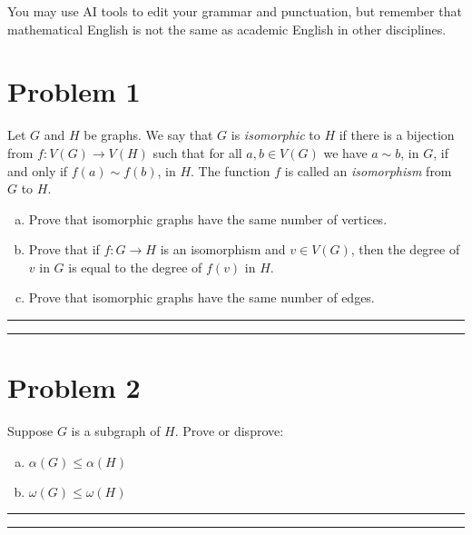 \documentclass{article}
\theoremstyle{definition}
\newenvironment{solution}{\bigskip\hrule{\hfill}}{\bigskip\hrule{\hfill}} %
\begin{document}
You may use AI tools to edit your grammar and punctuation, but remember that mathematical English is not the same as academic English in other disciplines. 

\vfill

\newpage


\section*{Problem 1}
Let $G$ and $H$ be graphs. We say that $G$ is \emph{isomorphic} to $H$ if there is a bijection from $f:V\left(G\right)\longrightarrow V\left(H\right)$ such that for all $a,b\in V\left(G\right)$ we have $a\sim b$, in $G$, if and only if $f\left(a\right)\sim f\left(b\right)$, in $H$. The function $f$ is called an \emph{isomorphism} from $G$ to $H$.
    \begin{enumerate}[a)] %
	\item Prove that isomorphic graphs have the same number of vertices. 
	\item Prove that if $f:G\longrightarrow H$ is an isomorphism and $v\in V\left(G\right)$, then the degree of $v$ in $G$ is equal to the degree of $f\left(v\right)$ in $H$.
	\item Prove that isomorphic graphs have the same number of edges.
    \end{enumerate}

\begin{solution}


\end{solution}


\newpage


\section*{Problem 2}
Suppose $G$ is a subgraph of $H$.  Prove or disprove:
    \begin{enumerate}[a)] %
	\item $\alpha(G) \leq \alpha(H)$
	\item $\omega(G) \leq \omega(H)$
    \end{enumerate}
\begin{solution}


\end{solution}
\end{document}
